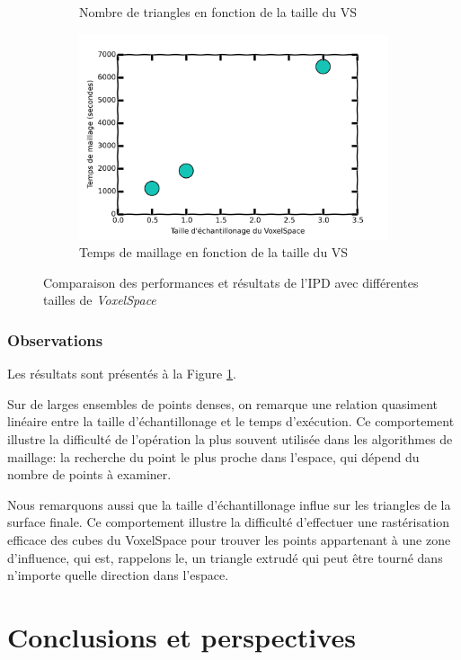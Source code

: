 \documentclass[a4paper,10pt]{report}
\begin{document}
\begin{figure}[h!]
\begin{subfigure}[b]{0.3\textwidth}
        \caption{Nombre de triangles en fonction de la taille du VS}
    \end{subfigure}
    \begin{subfigure}[b]{0.3\textwidth}
	    \includegraphics[width=\textwidth]{results/vs-time-cmp.png}
        \caption{Temps de maillage en fonction de la taille du VS}
    \end{subfigure}
    \caption{\label{fig:vscmp} Comparaison des performances et résultats de l'IPD avec différentes tailles de \textit{VoxelSpace}}
\end{figure}

\subsection{Observations}
Les résultats sont présentés à la Figure \ref{fig:vscmp}.

Sur de larges ensembles de points denses, on remarque une relation quasiment linéaire entre la taille d'échantillonage et le temps d'exécution. Ce comportement illustre la difficulté de l'opération la plus souvent utilisée dans les algorithmes de maillage: la recherche du point le plus proche dans l'espace, qui dépend du nombre de points à examiner.

Nous remarquons aussi que la taille d'échantillonage influe sur les triangles de la surface finale. Ce comportement illustre la difficulté d'effectuer une rastérisation efficace des cubes du VoxelSpace pour trouver les points appartenant à une zone d'influence, qui est, rappelons le, un triangle extrudé qui peut être tourné dans n'importe quelle direction dans l'espace.

\chapter{Conclusions et perspectives}
\end{document}
